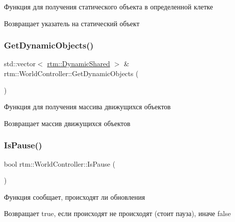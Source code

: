 Функция для получения статического объекта в определенной клетке 

\begin{DoxyReturn}{Возвращает}
указатель на статический объект 
\end{DoxyReturn}
\mbox{\label{classrtm_1_1_world_controller_a3f1ea0c4cb853482e4b4681fb14f9b4f}} 
\subsubsection{\texorpdfstring{Get\+Dynamic\+Objects()}{GetDynamicObjects()}}
{\footnotesize\ttfamily std\+::vector$<$ \hyperlink{namespacertm_af668a936c29b476890a79ad1eb19e3cc}{rtm\+::\+Dynamic\+Shared} $>$ \& rtm\+::\+World\+Controller\+::\+Get\+Dynamic\+Objects (\begin{DoxyParamCaption}{ }\end{DoxyParamCaption})}



Функция для получения массива движущихся объектов 

\begin{DoxyReturn}{Возвращает}
массив движущихся объектов 
\end{DoxyReturn}
\mbox{\label{classrtm_1_1_world_controller_a028e4f7ab189c6ad5fe889ca375786e4}} 
\subsubsection{\texorpdfstring{Is\+Pause()}{IsPause()}}
{\footnotesize\ttfamily bool rtm\+::\+World\+Controller\+::\+Is\+Pause (\begin{DoxyParamCaption}{ }\end{DoxyParamCaption})}



Функция сообщает, происходят ли обновления 

\begin{DoxyReturn}{Возвращает}
true, если происходят не происходят (стоит пауза), иначе false 
\end{DoxyReturn}
\mbox{\label{classrtm_1_1_world_controller_ae560ff85d296effbe814dbadc2514ccf}} 

